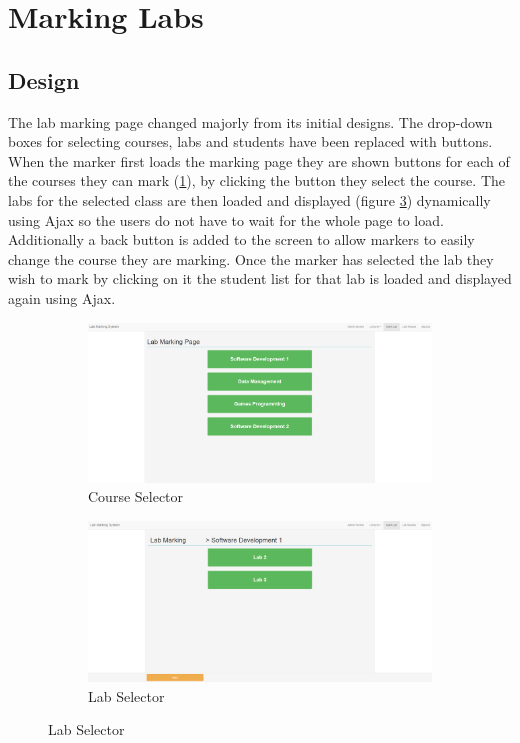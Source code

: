 \documentclass[11pt]{report}
\begin{document}
\section{Marking Labs}


\subsection{Design}
The lab marking page changed majorly from its initial designs. The drop-down boxes for selecting courses, labs and students have been replaced with buttons. When the marker first loads the marking page they are shown buttons for each of the courses they can mark (\ref{fig:marking-course}), by clicking the button they select the course. The labs for the selected class are then loaded and displayed (figure \ref{fig:marking-lab}) dynamically using Ajax so the users do not have to wait for the whole page to load. Additionally a back button is added to the screen to allow markers to easily change the course they are marking. Once the marker has selected the lab they wish to mark by clicking on it the student list for that lab is loaded and displayed again using Ajax.

\begin{figure}[H]
\caption{Lab Marking Page}
\centering
\begin{subfigure}[c]{0.45\textwidth}
    \includegraphics[width=1\textwidth]{images/implementation/marking-1-page.png}
    \caption{Course Selector}
    \label{fig:marking-course}
\end{subfigure}
\hfill
\begin{subfigure}[c]{0.45\textwidth}
    \includegraphics[width=1\textwidth]{images/implementation/marking-2-page.png}
    \caption{Lab Selector}
    \label{fig:marking-lab}
\end{subfigure}

\end{figure}
\end{document}
